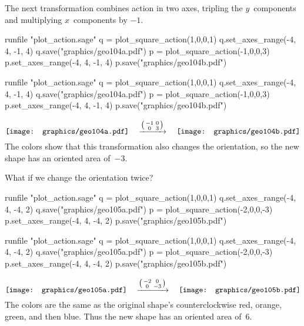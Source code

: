 The next transformation combines action in two axes, 
tripling the $y$~components and multiplying 
$x$~components by $-1$. 
\begin{sageoutput}[d,0,4;d,5,7]
runfile "plot_action.sage"
q = plot_square_action(1,0,0,1) 
q.set_axes_range(-4, 4, -1, 4) 
q.save("graphics/geo104a.pdf")
p = plot_square_action(-1,0,0,3) 
p.set_axes_range(-4, 4, -1, 4) 
p.save("graphics/geo104b.pdf")
\end{sageoutput}
\begin{sagesilent}
runfile "plot_action.sage"
q = plot_square_action(1,0,0,1) 
q.set_axes_range(-4, 4, -1, 4) 
q.save("graphics/geo104a.pdf")
p = plot_square_action(-1,0,0,3) 
p.set_axes_range(-4, 4, -1, 4) 
p.save("graphics/geo104b.pdf")
\end{sagesilent}
\begin{equation*}
  \vcenteredhbox{\texttt{[image: graphics/geo104a.pdf]}}
  \quad\mapsvia{\big (\begin{smallmatrix} -1 &0 \\ 0 &3 \end{smallmatrix}\big )}\quad
  \vcenteredhbox{\texttt{[image: graphics/geo104b.pdf]}}
\end{equation*}
The colors show that this transformation also changes
the orientation, so the new shape has an oriented area of~$-3$.

What if we change the orientation twice?
\begin{sageoutput}[d,0,4;d,5,7]
runfile "plot_action.sage"
q = plot_square_action(1,0,0,1) 
q.set_axes_range(-4, 4, -4, 2) 
q.save("graphics/geo105a.pdf")
p = plot_square_action(-2,0,0,-3) 
p.set_axes_range(-4, 4, -4, 2) 
p.save("graphics/geo105b.pdf")
\end{sageoutput}
\begin{sagesilent}
runfile "plot_action.sage"
q = plot_square_action(1,0,0,1) 
q.set_axes_range(-4, 4, -4, 2) 
q.save("graphics/geo105a.pdf")
p = plot_square_action(-2,0,0,-3) 
p.set_axes_range(-4, 4, -4, 2) 
p.save("graphics/geo105b.pdf")
\end{sagesilent}
\begin{equation*}
  \vcenteredhbox{\texttt{[image: graphics/geo105a.pdf]}}
  \quad\mapsvia{\big (\begin{smallmatrix} -2 &0 \\ 0 &-3 \end{smallmatrix}\big )}\quad
  \vcenteredhbox{\texttt{[image: graphics/geo105b.pdf]}}
\end{equation*}
The colors are the same as the original shape's counterclockwise
red, orange, green, and then blue.
Thus the new shape has an oriented area of~$6$.

